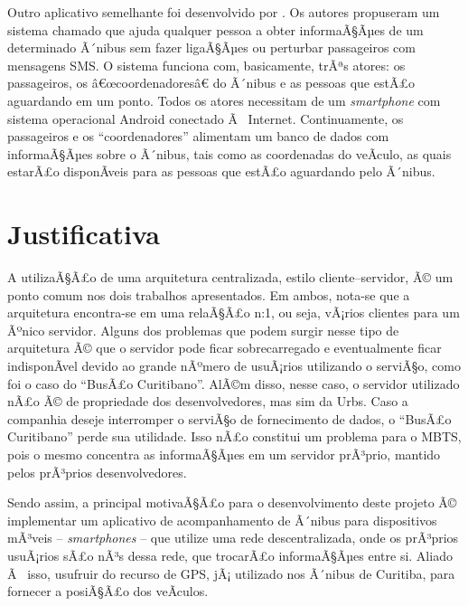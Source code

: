 Outro aplicativo semelhante foi desenvolvido por . Os autores propuseram um sistema chamado  que ajuda qualquer pessoa a obter informaÃ§Ãµes de um determinado Ã´nibus sem fazer ligaÃ§Ãµes ou perturbar passageiros com mensagens SMS. O sistema funciona com, basicamente, trÃªs atores: os passageiros, os â€œcoordenadoresâ€ do Ã´nibus e as pessoas que estÃ£o aguardando em um ponto. Todos os atores necessitam de um \textit{smartphone} com sistema operacional Android conectado Ã  Internet. Continuamente, os passageiros e os ``coordenadores'' alimentam um banco de dados com informaÃ§Ãµes sobre o Ã´nibus, tais como as coordenadas do veÃ­culo, as quais estarÃ£o disponÃ­veis para as pessoas que estÃ£o aguardando pelo Ã´nibus. 

\section{Justificativa}

A utilizaÃ§Ã£o de uma arquitetura centralizada, estilo cliente--servidor, Ã© um ponto comum nos dois trabalhos  apresentados. Em ambos, nota-se que a arquitetura encontra-se em uma relaÃ§Ã£o n:1, ou seja, vÃ¡rios clientes para um Ãºnico servidor. Alguns dos problemas que podem surgir nesse tipo de arquitetura Ã© que o servidor pode ficar sobrecarregado e eventualmente ficar indisponÃ­vel devido ao grande nÃºmero de usuÃ¡rios utilizando o serviÃ§o, como foi o caso do ``BusÃ£o Curitibano''. AlÃ©m disso, nesse caso, o servidor utilizado nÃ£o Ã© de propriedade dos desenvolvedores, mas sim da Urbs. Caso a companhia deseje interromper o serviÃ§o de fornecimento de dados, o ``BusÃ£o Curitibano'' perde sua utilidade. Isso nÃ£o constitui um problema para o MBTS, pois o mesmo concentra as informaÃ§Ãµes em um servidor prÃ³prio, mantido pelos prÃ³prios desenvolvedores.

Sendo assim, a principal motivaÃ§Ã£o para o desenvolvimento deste projeto Ã© implementar um aplicativo de acompanhamento de Ã´nibus para dispositivos mÃ³veis -- \textit{smartphones} -- que utilize uma rede descentralizada, onde os prÃ³prios usuÃ¡rios sÃ£o  nÃ³s dessa rede, que trocarÃ£o informaÃ§Ãµes entre si. Aliado Ã  isso, usufruir do recurso de GPS, jÃ¡ utilizado nos Ã´nibus de Curitiba, para fornecer a posiÃ§Ã£o dos veÃ­culos.

